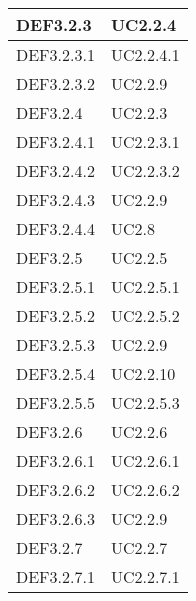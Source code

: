 \documentclass{scalatekids-article}
\begin{document}
\begin{longtable}[H]{|p{5.5cm}|p{5.5cm}|}
\hline
DEF3.2.3 & \multiLineCell[t]{UC2.2.4\\}\\
\hline
DEF3.2.3.1 & \multiLineCell[t]{UC2.2.4.1\\}\\
\hline
DEF3.2.3.2 & \multiLineCell[t]{UC2.2.9\\}\\
\hline
DEF3.2.4 & \multiLineCell[t]{UC2.2.3\\}\\
\hline
DEF3.2.4.1 & \multiLineCell[t]{UC2.2.3.1\\}\\
\hline
DEF3.2.4.2 & \multiLineCell[t]{UC2.2.3.2\\}\\
\hline
DEF3.2.4.3 & \multiLineCell[t]{UC2.2.9\\}\\
\hline
DEF3.2.4.4 & \multiLineCell[t]{UC2.8\\}\\
\hline
DEF3.2.5 & \multiLineCell[t]{UC2.2.5\\}\\
\hline
DEF3.2.5.1 & \multiLineCell[t]{UC2.2.5.1\\}\\
\hline
DEF3.2.5.2 & \multiLineCell[t]{UC2.2.5.2\\}\\
\hline
DEF3.2.5.3 & \multiLineCell[t]{UC2.2.9\\}\\
\hline
DEF3.2.5.4 & \multiLineCell[t]{UC2.2.10\\}\\
\hline
DEF3.2.5.5 & \multiLineCell[t]{UC2.2.5.3\\}\\
\hline
DEF3.2.6 & \multiLineCell[t]{UC2.2.6\\}\\
\hline
DEF3.2.6.1 & \multiLineCell[t]{UC2.2.6.1\\}\\
\hline
DEF3.2.6.2 & \multiLineCell[t]{UC2.2.6.2\\}\\
\hline
DEF3.2.6.3 & \multiLineCell[t]{UC2.2.9\\}\\
\hline
DEF3.2.7 & \multiLineCell[t]{UC2.2.7\\}\\
\hline
DEF3.2.7.1 & \multiLineCell[t]{UC2.2.7.1\\}\\

\end{longtable}
\end{document}
